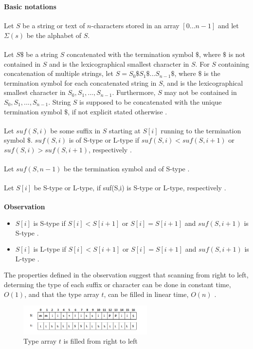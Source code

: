 \documentclass[12pt]{article} %
\begin{document}
\textbf{Basic notations}
\\ \\
Let $S$ be a string or text of $n$-characters stored in an array $[0…n-1]$ and let $\Sigma(s)$ be the alphabet of $S$. 
\\ \\
Let $S$$\$$ be a string $S$ concatenated with the termination symbol $\$$, where $\$$ is not contained in $S$ and is the lexicographical smallest character in $S$. For $S$ containing concatenation of multiple strings, let $S={S_0\$S_1\$...S_{n-1}\$}$, where $\$$ is the termination symbol for each concatenated string in $S$, and is the lexicographical smallest character in $S_0,S_1,...,S_{n-1}$. Furthermore, $S$ may not be contained in $S_0,S_1,...,S_{n-1}$. String $S$ is supposed to be concatenated with the unique termination symbol $\$$, if not explicit   stated otherwise \cite{twoeffecient}.
\\ \\
Let $suf(S,i)$ be some suffix in $S$ starting at $S[i]$ running to the termination symbol $\$$. $suf(S,i)$ is of S-type or L-type if $suf(S,i) < suf(S,i+1)$ or $suf(S,i) > suf(S,i+1)$, respectively \cite{twoeffecient}.
\\ \\
Let $suf(S, n-1)$ be the termination symbol and of S-type \cite{twoeffecient}.
\\ \\
Let $S[i]$ be S-type or L-type, if suf(S,i) is S-type or L-type, respectively \cite{twoeffecient}.
\\ \\
\textbf{Observation}
\begin{itemize}
  \item $S[i]$ is  S-type if $S[i] < S[i+1]$ or $S[i] = S[i+1]$ and $suf(S, i+1)$ is S-type \cite{twoeffecient}.
  \item $S[i]$ is  L-type if $S[i] < S[i+1]$ or $S[i] = S[i+1]$ and $suf(S, i+1)$ is L-type \cite{twoeffecient}.
\end{itemize}

The properties defined in the observation suggest that scanning from right to left, determing the type of each suffix or character can be done in constant time, $O(1)$, and that the type array $t$, can be filled in linear time, $O(n)$ \cite{twoeffecient}.

\begin{figure}[H]
    \centering
    \includegraphics[width=0.6\textwidth]{SAISmmii1}
    \captionsetup{width=0.8\textwidth}
    \caption{Type array $t$ is filled from right to left}
    \label{fig:SAISmmii1}
\end{figure}
\end{document}
